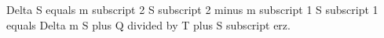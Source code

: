 Delta S equals m subscript 2 S subscript 2 minus m subscript 1 S subscript 1 equals Delta m S plus Q divided by T plus S subscript erz.